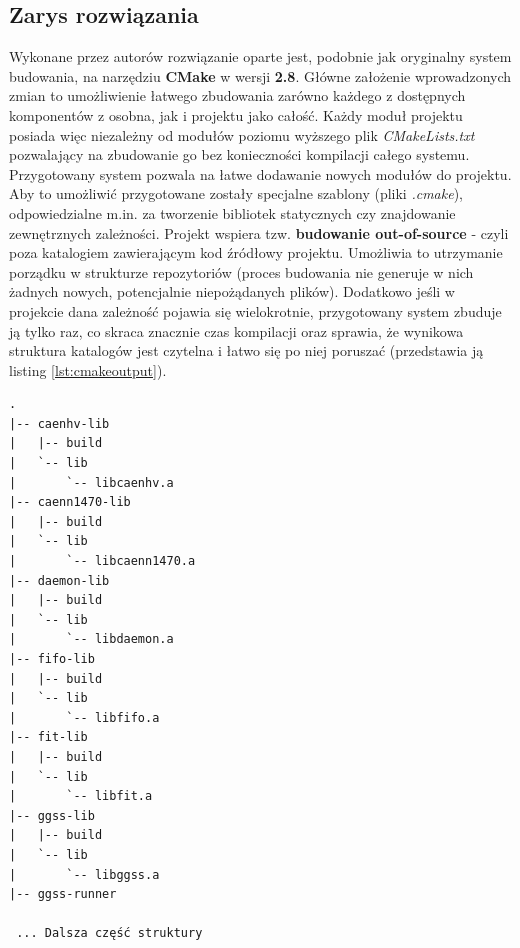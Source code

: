 \subsection{Zarys rozwiązania} 
Wykonane przez autorów rozwiązanie oparte jest, podobnie jak oryginalny system budowania, na narzędziu \textbf{CMake} w wersji \textbf{2.8}. Główne założenie wprowadzonych zmian to umożliwienie łatwego zbudowania zarówno każdego z dostępnych komponentów z osobna, jak i projektu jako całość. Każdy moduł projektu posiada więc niezależny od modułów poziomu wyższego plik \textit{CMakeLists.txt} pozwalający na zbudowanie go bez konieczności kompilacji całego systemu. Przygotowany system pozwala na łatwe dodawanie nowych modułów do projektu. Aby to umożliwić przygotowane zostały specjalne szablony (pliki \textit{.cmake}), odpowiedzialne m.in. za tworzenie bibliotek statycznych czy znajdowanie zewnętrznych zależności. Projekt wspiera tzw. \textbf{budowanie out-of-source} - czyli poza katalogiem zawierającym kod źródłowy projektu. Umożliwia to utrzymanie porządku w strukturze repozytoriów (proces budowania nie generuje w nich żadnych nowych, potencjalnie niepożądanych plików). Dodatkowo jeśli w projekcie dana zależność pojawia się wielokrotnie, przygotowany system zbuduje ją tylko raz, co skraca znacznie czas kompilacji oraz sprawia, że wynikowa struktura katalogów jest czytelna i łatwo się po niej poruszać (przedstawia ją listing \ref{lst:cmakeoutput}). 

\begin{lstlisting}[language=Cmd, caption={Fragment struktury katalogów wygenerowanej przez nowy system budujący projekt (użycie dla repozytorium \textit{ggss-runner}). Dla uproszczenia pominięta została zawartość katalogów \textit{build}. Przykład ilustruje płaską strukturę wynikową ułatwiającą szybkie znalezienie odpowiedniej biblioteki lub pliku wykonywalnego (tutaj \textit{ggss-runner})}, label={lst:cmakeoutput}]
.
|-- caenhv-lib
|   |-- build
|   `-- lib
|       `-- libcaenhv.a
|-- caenn1470-lib
|   |-- build
|   `-- lib
|       `-- libcaenn1470.a
|-- daemon-lib
|   |-- build
|   `-- lib
|       `-- libdaemon.a
|-- fifo-lib
|   |-- build
|   `-- lib
|       `-- libfifo.a
|-- fit-lib
|   |-- build
|   `-- lib
|       `-- libfit.a
|-- ggss-lib
|   |-- build
|   `-- lib
|       `-- libggss.a
|-- ggss-runner
 
 ... Dalsza część struktury
\end{lstlisting}


